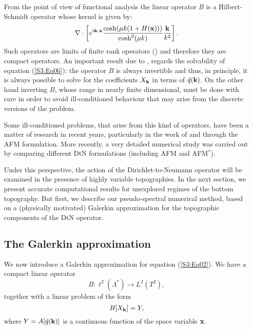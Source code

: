 

From the point of view of functional analysis the linear operator $B$ is a Hilbert-Schmidt operator whose kernel is given by: 
\begin{equation}
\nabla\cdot \left[ e^{i\bold{k}\cdot\bold{x}} \frac{\cosh(\mu k(1+H(\bold{x})))}{\cosh^2(\mu k)}\frac{\bold{k}}{k^2}\right].
\end{equation}
Such operators are limits of finite rank operators (\cite{DunfordSchwartz}) and therefore they are compact operators.
An important result due to \citet{CSNG}, regards the solvability of equation (\ref{S3:Eq06}): 
the operator $B$ is always invertible and thus, in principle, it is always possible to solve for the coefficients $X_{\bold{k}}$ 
in terms of $\hat{q}(\bold{k})$.  
On the other hand inverting $B$, whose range in nearly finite dimensional, must be done with care 
in order to avoid ill-conditioned behaviour that may arise from the 
discrete versions of the problem. %

Some ill-conditioned problems, that arise from this kind of operators, have been a matter of research in recent years, particularly in the work of 
\citet{OliverasDeconinck} and \citet{VasanDeconinck} through the AFM formulation. 
More recently, a very detailed numerical study was carried out by \citet{WilkeningVasan} comparing different DtN formulations (including AFM and AFM$^\ast$).

Under this perspective, the action of the Dirichlet-to-Neumann operator will be examined in the presence of
highly variable topographies. In the next section, we present accurate computational results 
for unexplored regimes of the bottom topography.   
But first, we describe our pseudo-spectral numerical method, based on a (physically motivated) Galerkin approximation
for the topographic components of the DtN operator.

\subsection{The Galerkin approximation}
We now introduce a Galerkin approximation for equation (\ref{S3:Eq02}). 
We have a compact linear operator
\begin{equation}
B:\ell^2(\Lambda^*) \longrightarrow L^2(T^2),
\end{equation}
together with a linear problem of the form
\begin{equation}
B[X_{\bold{k}}] = Y,
\end{equation}
where $Y = A[\hat{q}(\bold{k})]$ is a continuous function of the space variable $\bold{x}$.

